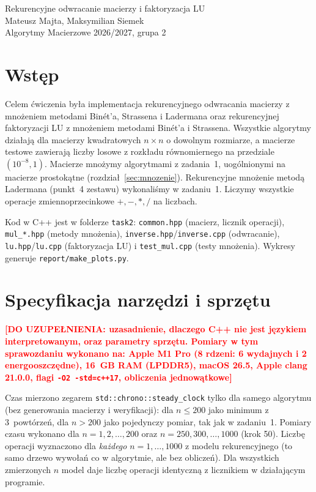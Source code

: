 \documentclass[11pt,a4paper]{article}
\newcommand{\todo}[1]{\textcolor{red}{\textbf{[DO UZUPEŁNIENIA: #1]}}}
\begin{document}
\thispagestyle{plain}
\begin{center}
\vspace*{3.5cm}
{\Large Rekurencyjne odwracanie macierzy i faktoryzacja LU}\\[1.5em]
Mateusz Majta, Maksymilian Siemek\\[1.2em]
Algorytmy Macierzowe 2026/2027, grupa 2
\end{center}
\vspace{1.2cm}
\tableofcontents
\newpage

\section{Wstęp}
Celem ćwiczenia była implementacja rekurencyjnego odwracania macierzy z mnożeniem metodami Binét'a, Strassena
i Ladermana oraz rekurencyjnej faktoryzacji LU z mnożeniem metodami Binét'a i Strassena. Wszystkie algorytmy działają
dla macierzy kwadratowych $n\times n$ o dowolnym rozmiarze, a macierze testowe zawierają liczby losowe z rozkładu
równomiernego na przedziale $(10^{-8}, 1)$. Macierze mnożymy algorytmami z zadania~1, uogólnionymi na macierze
prostokątne (rozdział~\ref{sec:mnozenie}). Rekurencyjne mnożenie metodą Ladermana (punkt~4 zestawu) wykonaliśmy
w zadaniu~1. Liczymy wszystkie operacje zmiennoprzecinkowe $+,-,*,/$ na liczbach.

Kod w C++ jest w folderze \texttt{task2}: \texttt{common.hpp} (macierz, licznik operacji), \texttt{mul\_*.hpp}
(metody mnożenia), \texttt{inverse.hpp}/\texttt{inverse.cpp} (odwracanie), \texttt{lu.hpp}/\texttt{lu.cpp}
(faktoryzacja LU) i \texttt{test\_mul.cpp} (testy mnożenia). Wykresy generuje \texttt{report/make\_plots.py}.

\section{Specyfikacja narzędzi i sprzętu}
\todo{uzasadnienie, dlaczego C++ nie jest językiem interpretowanym, oraz parametry sprzętu. Pomiary w tym
sprawozdaniu wykonano na: Apple M1 Pro (8 rdzeni: 6 wydajnych i 2 energooszczędne), 16~GB RAM (LPDDR5), macOS 26.5,
Apple clang 21.0.0, flagi \texttt{-O2 -std=c++17}, obliczenia jednowątkowe}

Czas mierzono zegarem \texttt{std::chrono::steady\_clock} tylko dla samego algorytmu (bez generowania macierzy
i weryfikacji): dla $n\le200$ jako minimum z 3~powtórzeń, dla $n>200$ jako pojedynczy pomiar, tak jak w zadaniu~1.
Pomiary czasu wykonano dla $n=1,2,\dots,200$ oraz $n=250,300,\dots,1000$ (krok 50). Liczbę operacji wyznaczono dla
\emph{każdego} $n=1,\dots,1000$ z modelu rekurencyjnego (to samo drzewo wywołań co w algorytmie, ale bez obliczeń).
Dla wszystkich zmierzonych $n$ model daje liczbę operacji identyczną z licznikiem w działającym programie.
\end{document}
